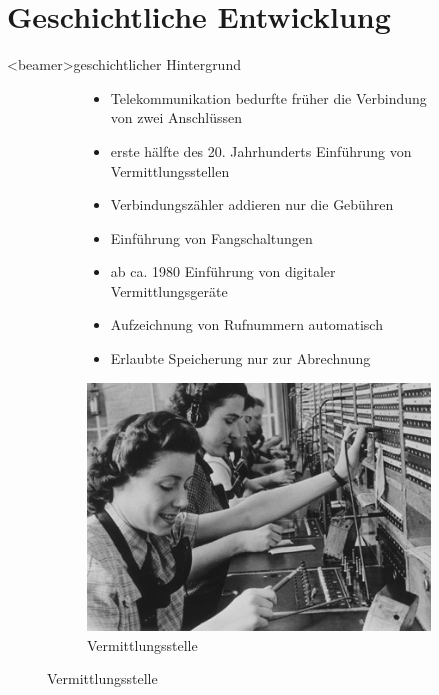 
\section{Geschichtliche Entwicklung}
    \begin{frame}<beamer>{geschichtlicher Hintergrund}
      \begin{figure}
        \begin{subfigure}[b]{0.5\textwidth}
          \begin{itemize}
            \item
              Telekommunikation bedurfte früher die Verbindung von zwei Anschlüssen
            \item
              erste hälfte des 20. Jahrhunderts Einführung von Vermittlungsstellen
            \item
              Verbindungszähler addieren nur die Gebühren
            \item
              Einführung von Fangschaltungen
            \item 
             ab ca. 1980 Einführung von digitaler Vermittlungsgeräte
            \item
              Aufzeichnung von Rufnummern automatisch
            \item
              Erlaubte Speicherung nur zur Abrechnung
          \end{itemize}
        \end{subfigure}
        \begin{subfigure}[b]{0.3\textwidth}
          \includegraphics[scale=1]{sections/img/vermittlungsstellen.jpg}
          \caption{Vermittlungsstelle}
          \label{fig:vermittlungsstelle}
        \end{subfigure}
      \end{figure}
    \end{frame}
